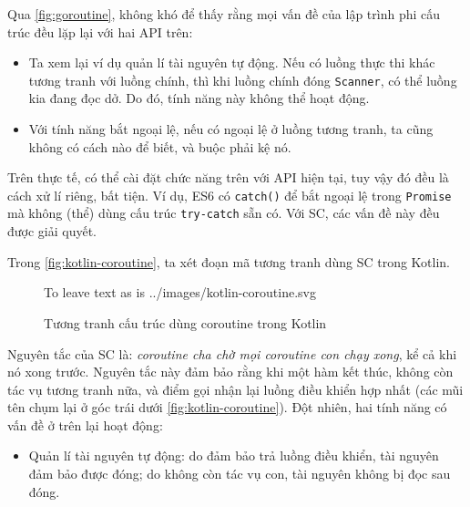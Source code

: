 \documentclass[../../thesis]{subfiles}
\begin{document}
Qua \autoref{fig:goroutine}, không khó để thấy rằng mọi vấn đề của lập trình phi
cấu trúc đều lặp lại với hai API trên:

\begin{itemize}
    \item
        Ta xem lại ví dụ quản lí tài nguyên tự động. Nếu có luồng thực thi khác
        tương tranh với luồng chính, thì khi luồng chính đóng \texttt{Scanner},
        có thể luồng kia đang đọc dở. Do đó, tính năng này không thể hoạt động.
\end{itemize}

\begin{itemize}[resume, before = \vspace*{-\dimexpr\topsep+\partopsep\relax}]
    \item
        Với tính năng bắt ngoại lệ, nếu có ngoại lệ ở luồng tương tranh, ta cũng
        không có cách nào để biết, và buộc phải kệ nó.
\end{itemize}

Trên thực tế, có thể cài đặt chức năng trên với API hiện tại, tuy vậy đó đều là
cách xử lí riêng, bất tiện. Ví dụ, ES6 có \texttt{catch()} để bắt ngoại lệ trong
\texttt{Promise} mà không (thể) dùng cấu trúc \texttt{try-catch} sẵn có. Với SC,
các vấn đề này đều được giải quyết.

Trong \autoref{fig:kotlin-coroutine}, ta xét đoạn mã tương tranh dùng SC trong
Kotlin.

\begin{figure}
    \centering
    \vspace*{-6mm}
     To leave text as is
        {../images/kotlin-coroutine.svg}                 %
    \vspace*{-10mm}
    \caption{Tương tranh cấu trúc dùng coroutine trong Kotlin \cite{NJS_SC}}
    \label{fig:kotlin-coroutine}
\end{figure}

Nguyên tắc của SC là: \emph{coroutine cha chờ mọi coroutine con chạy xong}, kể
cả khi nó xong trước. Nguyên tắc này đảm bảo rằng khi một hàm kết thúc, không
còn tác vụ tương tranh nữa, và điểm gọi nhận lại luồng điều khiển hợp nhất (các
mũi tên chụm lại ở góc trái dưới \autoref{fig:kotlin-coroutine}). Đột nhiên, hai
tính năng có vấn đề ở trên lại hoạt động:

\begin{itemize}
    \item
        Quản lí tài nguyên tự động: do đảm bảo trả luồng điều khiển, tài nguyên
        đảm bảo được đóng; do không còn tác vụ con, tài nguyên không bị đọc sau
        đóng.
\end{itemize}
\end{document}
